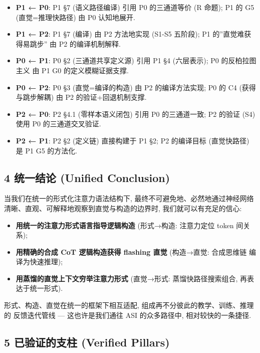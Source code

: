\documentclass[
]{article}
\providecommand{\tightlist}{%
  \setlength{\itemsep}{0pt}\setlength{\parskip}{0pt}}
\begin{document}
\begin{itemize}
\tightlist
\item
  \textbf{P1 ← P0}: P1 §7 (语义路径编译) 引用 P0 的三通道等价 (R 命题);
  P1 的 G5 (直觉=推理快路径) 由 P0 认知地展开.
\item
  \textbf{P1 ← P2}: P1 §7 (编译) 由 P2 方法地实现 (S1-S5 五阶段); P1
  的''直觉难获得易跳步'' 由 P2 的编译机制解释.
\item
  \textbf{P0 ← P1}: P0 §2 (三通道共享定义源) 引用 P1 §4 (六层表示); P0
  的反柏拉图主义 由 P1 G0 的定义模糊证据支撑.
\item
  \textbf{P0 ← P2}: P0 §3 (直觉=编译的构造) 由 P2 的编译方法实现; P0 的
  C4 (获得与跳步解耦) 由 P2 的验证+回退机制支撑.
\item
  \textbf{P2 ← P0}: P2 §4.1 (零样本语义闭包) 引用 P0 的三通道一致; P2
  的验证 (S4) 使用 P0 的三通道交叉验证.
\item
  \textbf{P2 ← P1}: P2 §2 (定义链) 直接构建于 P1 §2; P2 的编译目标
  (直觉快路径) 是 P1 G5 的方法化.
\end{itemize}

\subsection{4 统一结论 (Unified
Conclusion)}\label{ux7edfux4e00ux7ed3ux8bba-unified-conclusion}

当我们在统一的形式化注意力语法结构下, 最终不可避免地、必然地通过神经网络
清晰、直观、可解释地观察到直觉与构造的边界时, 我们就可以有充足的信心:

\begin{itemize}
\tightlist
\item
  \textbf{用统一的注意力形式语言指导逻辑构造} (形式→构造: 注意力定位
  token 间关系);
\item
  \textbf{用精确的合成 CoT 逻辑构造获得 flashing 直觉} (构造→直觉:
  合成思维链 编译为快速推理);
\item
  \textbf{用蒸馏的直觉上下文穷举注意力形式} (直觉→形式:
  蒸馏快路径搜索组合, 再表达于统一形式).
\end{itemize}

形式、构造、直觉在统一的框架下相互适配,
组成再不分彼此的教学、训练、推理的 反馈迭代管线 --- 这也许是我们通往 ASI
的众多路径中, 相对较快的一条捷径.

\subsection{5 已验证的支柱 (Verified
Pillars)}\label{ux5df2ux9a8cux8bc1ux7684ux652fux67f1-verified-pillars}
\end{document}
